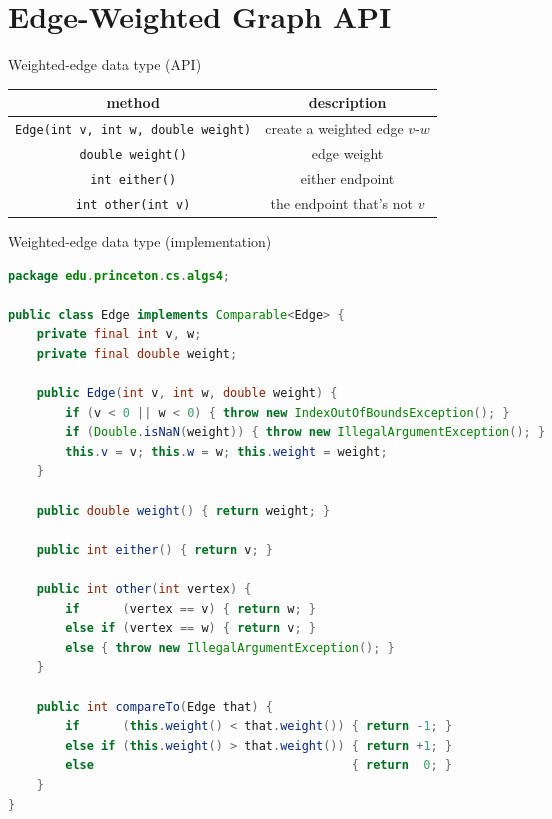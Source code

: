 \documentclass[8pt,a4paper,compress]{beamer}
\begin{document}
\section{Edge-Weighted Graph API}
\begin{frame}
\pause

Weighted-edge data type (API)
\begin{center}
\begin{tabular}{cc}
method & description \\ \hline 
\lstinline$Edge(int v, int w, double weight)$ & create a weighted edge $v$-$w$ \\
\lstinline$double weight()$ & edge weight \\
\lstinline$int either()$ & either endpoint \\
\lstinline$int other(int v)$ & the endpoint that's not $v$
\end{tabular}  
\end{center}
\end{frame}

\begin{frame}[fragile]
\pause

Weighted-edge data type (implementation)
\begin{lstlisting}[language=Java]
package edu.princeton.cs.algs4;

public class Edge implements Comparable<Edge> {
    private final int v, w;
    private final double weight;

    public Edge(int v, int w, double weight) {
        if (v < 0 || w < 0) { throw new IndexOutOfBoundsException(); }
        if (Double.isNaN(weight)) { throw new IllegalArgumentException(); }
        this.v = v; this.w = w; this.weight = weight;
    }

    public double weight() { return weight; }

    public int either() { return v; }

    public int other(int vertex) {
        if      (vertex == v) { return w; }
        else if (vertex == w) { return v; }
        else { throw new IllegalArgumentException(); }
    }

    public int compareTo(Edge that) {
        if      (this.weight() < that.weight()) { return -1; }
        else if (this.weight() > that.weight()) { return +1; }
        else                                    { return  0; }
    }
}
\end{lstlisting}
\end{frame}
\end{document}
